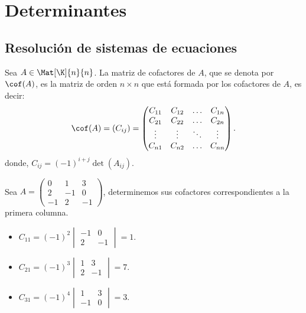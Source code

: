 \documentclass[compacto,10pt]{pubciencias-notas}
\begin{document}
\encabezado

\vspace*{-8mm}

\setcounter{section}{2}
\section{Determinantes}
\setcounter{subsection}{1}
\subsection{Resolución de sistemas de ecuaciones}

\begin{defi}
Sea $A\in\Mat[\K]{n}{n}$. La matriz de cofactores de $A$, que se denota por $\cof(A)$, es la matriz de orden $n \times n$ que está formada por los cofactores de $A$, es decir:
\[
\cof(A) = (C_{ij}) = 
\begin{pmatrix}
C_{11}&C_{12}&\ldots&C_{1n}\\
C_{21}&C_{22}&\ldots&C_{2n}\\
\vdots&\vdots&\ddots&\vdots\\
C_{n1}&C_{n2}&\ldots&C_{nn}
\end{pmatrix}.
\]
donde, $C_{ij} = (-1)^{i+j} \det (A_{ij})$.
\end{defi}

\begin{ejem}\label{matrizcofactores}
    Sea $A = 
    \begin{pmatrix}
    0 & 1 & 3 \\
    2 & -1 & 0 \\
    -1 & 2 & -1
    \end{pmatrix}$, determinemos sus cofactores correspondientes a la primera columna.
    \begin{itemize}
    \item
        $C_{11} = (-1)^{2} 
        \begin{vmatrix}
            -1 & 0 \\
            2 & -1
        \end{vmatrix} = 1$.
        
    \item
        $C_{21} = (-1)^{3}
        \begin{vmatrix}
            1 & 3 \\
            2 & -1
        \end{vmatrix} = 7$.
        
    \item
        $C_{31} = (-1)^{4}
        \begin{vmatrix}
            1 & 3 \\
            -1 & 0
        \end{vmatrix} = 3$.
    \end{itemize}
\end{ejem}
\end{document}
